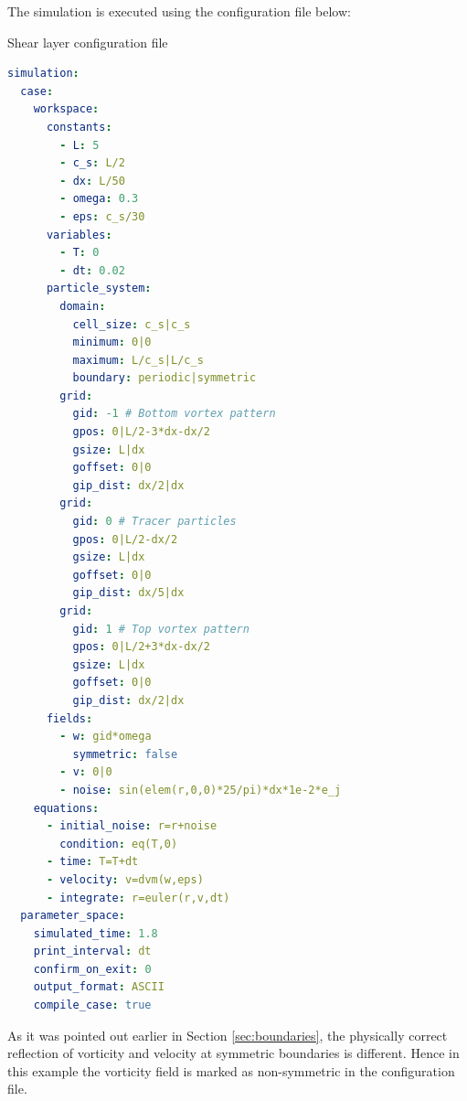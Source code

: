 \documentclass[a4paper,12pt,openany]{book}
\theoremstyle{break}
\begin{document}
The simulation is executed using the configuration file below:
\begin{samepage}
\begin{example}{Shear layer configuration file}{}
\lstset{basicstyle=\tiny}
\begin{lstlisting}[language=YAML]
simulation:
  case:
    workspace:
      constants:
        - L: 5
        - c_s: L/2
        - dx: L/50
        - omega: 0.3
        - eps: c_s/30
      variables:
        - T: 0
        - dt: 0.02
      particle_system:
        domain:
          cell_size: c_s|c_s
          minimum: 0|0
          maximum: L/c_s|L/c_s
          boundary: periodic|symmetric
        grid:
          gid: -1 # Bottom vortex pattern
          gpos: 0|L/2-3*dx-dx/2
          gsize: L|dx
          goffset: 0|0
          gip_dist: dx/2|dx
        grid:
          gid: 0 # Tracer particles
          gpos: 0|L/2-dx/2
          gsize: L|dx
          goffset: 0|0
          gip_dist: dx/5|dx
        grid:
          gid: 1 # Top vortex pattern
          gpos: 0|L/2+3*dx-dx/2
          gsize: L|dx
          goffset: 0|0
          gip_dist: dx/2|dx
      fields:
        - w: gid*omega
          symmetric: false
        - v: 0|0
        - noise: sin(elem(r,0,0)*25/pi)*dx*1e-2*e_j
    equations:
      - initial_noise: r=r+noise
        condition: eq(T,0)
      - time: T=T+dt
      - velocity: v=dvm(w,eps)
      - integrate: r=euler(r,v,dt)
  parameter_space:
    simulated_time: 1.8
    print_interval: dt
    confirm_on_exit: 0
    output_format: ASCII
    compile_case: true
\end{lstlisting}
\end{example}
\end{samepage}
As it was pointed out earlier in Section \ref{sec:boundaries}, the physically correct reflection of vorticity and velocity at symmetric boundaries is different. Hence in this example the vorticity field is marked as non-symmetric in the configuration file.
\end{document}
